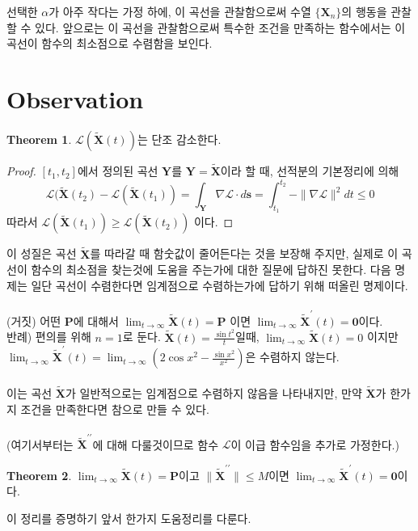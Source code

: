 \documentclass[a4paper,20pt]{article}
\theoremstyle{definition}
\newtheorem{theorem}{Theorem}[section]
\newcommand{\limit}[2][\infty]{\lim_{#2 \to #1}}
\newcommand{\curve}[1][X]{\tilde{\mathbf{#1}}}
\begin{document}
선택한 $\alpha$가 아주 작다는 가정 하에, 이 곡선을 관찰함으로써 수열 $\{\mathbf{X}_{n}\}$의 행동을 관찰할 수 있다. 앞으로는 이 곡선을 관찰함으로써 특수한 조건을 만족하는 함수에서는 이 곡선이 함수의 최소점으로 수렴함을 보인다.

\section{Observation}

\begin{theorem}
$\mathcal{L}(\curve(t))$는 단조 감소한다.
\end{theorem}

\begin{proof}
$[t_{1},t_{2}]$에서 정의된 곡선 $\mathbf{Y}$를 $\mathbf{Y}=\curve$이라 할 때, 선적분의 기본정리에 의해
$$ 
\mathcal{L}(\curve(t_{2})-\mathcal{L}(\curve(t_{1}))
= \int_\mathbf{Y} \nabla\mathcal{L} \cdot d\mathbf{s}=\int_{t_{1}}^{t_{2}}-\| \nabla \mathcal{L} \|^{2} dt \leq 0  
$$
따라서 $\mathcal{L}(\curve(t_{1}))\geq\mathcal{L}(\curve(t_{2}))$ 이다. 
\end{proof}

이 성질은 곡선 $\curve$를 따라갈 때 함숫값이 줄어든다는 것을 보장해 주지만, 실제로 이 곡선이 함수의 최소점을 찾는것에 도움을 주는가에 대한 
질문에 답하진 못한다. 다음 명제는 일단 곡선이 수렴한다면 임계점으로 수렴하는가에 답하기 위해 떠올린 명제이다.		
\\\\
(거짓) 어떤 $\mathbf{P}$에 대해서 $\limit{t}\curve(t)=\mathbf{P}$ 이면 
$\limit{t}\curve^{\prime}(t)=\mathbf{0}$이다. \\
반례) 편의를 위해 $n=1$로 둔다. $\curve(t)=\frac{\sin t^{2}}{t}$일때, $\limit{t}\curve(t)=0$ 이지만 
$\limit{t}\curve^{\prime}(t)=\limit{t}(2\cos x^{2}-\frac{\sin x^{2}}{x^{2}})$은 수렴하지 않는다.
\\\\
이는 곡선 $\curve$가 일반적으로는 임계점으로 수렴하지 않음을 나타내지만, 만약 $\curve$가 한가지 조건을 만족한다면 참으로 만들 수 있다.
\\\\
(여기서부터는 $\curve^{\prime \prime}$에 대해 다룰것이므로 함수 $\mathcal{L}$이 이급 함수임을 추가로 가정한다.)
\begin{theorem}
$\limit{t} \curve(t)=\mathbf{P}$이고 $\|\curve^{\prime \prime}\|\leq M$이면 
$\limit{t}\curve^{\prime}(t)=\mathbf{0}$이다.
\end{theorem}

이 정리를 증명하기 앞서 한가지 도움정리를 다룬다.
\end{document}
